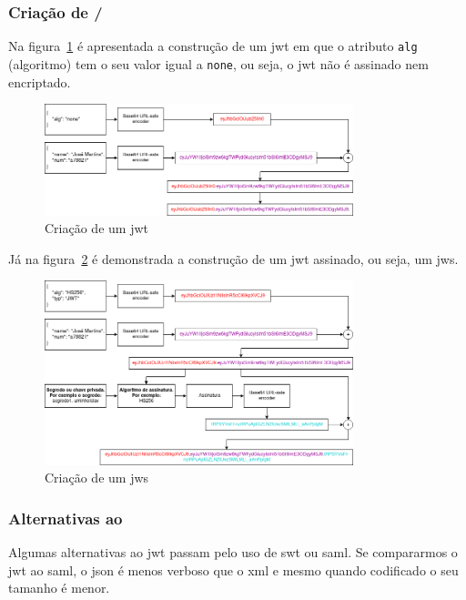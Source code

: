 \subsubsection{Criação de /}\label{sec:criacaojwt}

Na figura~\ref{fig:buildJWT} é apresentada a construção de um \acrshort{jwt} em que o atributo 
\texttt{alg} (algoritmo) tem o seu valor igual a \texttt{none}, ou seja, o \acrshort{jwt} não é 
assinado nem encriptado.

\begin{figure}[H]
    \centering
    \includegraphics[width=0.8\textwidth]{img/buildJWT.png}
    \caption{Criação de um \acrshort{jwt}}\label{fig:buildJWT}
\end{figure}

Já na figura~\ref{fig:buildJWS} é demonstrada a construção de um \acrshort{jwt} assinado, ou seja, um \acrshort{jws}.

\begin{figure}[H]
    \centering
    \includegraphics[width=0.8\textwidth]{img/buildJWS.png}
    \caption{Criação de um \acrshort{jws}}\label{fig:buildJWS}
\end{figure}

\subsubsection{Alternativas ao }

Algumas alternativas ao \acrshort{jwt} passam pelo uso de \acrfull{swt} ou \acrfull{saml}. 
Se compararmos o \acrshort{jwt} ao \acrshort{saml}, o \acrshort{json} é menos verboso que o 
\acrshort{xml} e mesmo quando codificado o seu tamanho é menor. 

